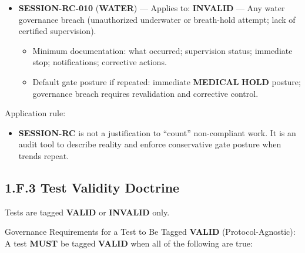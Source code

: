 \documentclass[10pt]{article}
\begin{document}
\begin{itemize}
\begin{itemize}
\item Minimum documentation: what was missing; whether verifiable reconstruction from same-day records was attempted; why it failed.
\item Default gate posture if repeated: repeated \textbf{ADMIN} invalidity → \textbf{HOLD} until logging compliance restored.
\end{itemize}
\item \textbf{SESSION-RC-010} (\textbf{WATER}) — Applies to: \textbf{INVALID} — Any water governance breach (unauthorized underwater or breath-hold attempt; lack of certified supervision).
\begin{itemize}
\item Minimum documentation: what occurred; supervision status; immediate stop; notifications; corrective actions.
\item Default gate posture if repeated: immediate \textbf{MEDICAL} \textbf{HOLD} posture; governance breach requires revalidation and corrective control.
\end{itemize}
\end{itemize}

Application rule:

\begin{itemize}
\item \textbf{SESSION-RC} is not a justification to “count” non-compliant work. It is an audit tool to describe reality and enforce conservative gate posture when trends repeat.
\end{itemize}

\newpage

\subsection*{1.F.3 Test Validity Doctrine}
{}

Tests are tagged \textbf{VALID} or \textbf{INVALID} only.

Governance Requirements for a Test to Be Tagged \textbf{VALID} (Protocol-Agnostic):
A test \textbf{MUST} be tagged \textbf{VALID} when all of the following are true:
\end{document}
